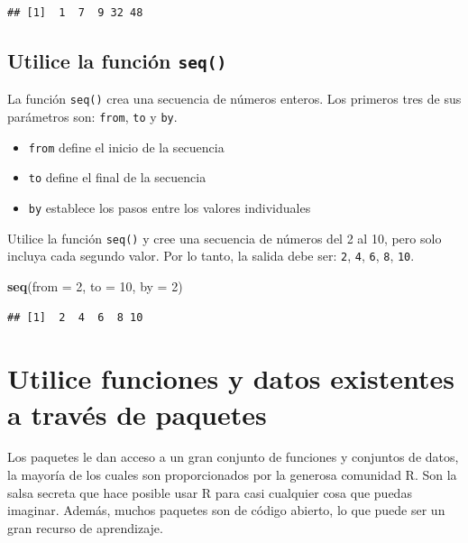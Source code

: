 \documentclass[
]{book}
\newenvironment{Shaded}{\begin{snugshade}}{\end{snugshade}}
\newcommand{\DataTypeTok}[1]{\textcolor[rgb]{0.13,0.29,0.53}{#1}}
\newcommand{\DecValTok}[1]{\textcolor[rgb]{0.00,0.00,0.81}{#1}}
\newcommand{\KeywordTok}[1]{\textcolor[rgb]{0.13,0.29,0.53}{\textbf{#1}}}
\newcommand{\NormalTok}[1]{#1}
\providecommand{\tightlist}{%
  \setlength{\itemsep}{0pt}\setlength{\parskip}{0pt}}
\begin{document}
\begin{verbatim}
## [1]  1  7  9 32 48
\end{verbatim}

\hypertarget{utilice-la-funciuxf3n-seq}{%
\subsection{\texorpdfstring{Utilice la función \texttt{seq()}}{Utilice la función seq()}}\label{utilice-la-funciuxf3n-seq}}

La función \texttt{seq()} crea una secuencia de números enteros. Los primeros tres de sus parámetros son: \texttt{from}, \texttt{to} y \texttt{by}.

\begin{itemize}
\tightlist
\item
  \texttt{from} define el inicio de la secuencia
\item
  \texttt{to} define el final de la secuencia
\item
  \texttt{by} establece los pasos entre los valores individuales
\end{itemize}

Utilice la función \texttt{seq()} y cree una secuencia de números del 2 al 10, pero solo incluya cada segundo valor. Por lo tanto, la salida debe ser: \texttt{2}, \texttt{4}, \texttt{6}, \texttt{8}, \texttt{10}.

\begin{Shaded}
\begin{Highlighting}[]
\KeywordTok{seq}\NormalTok{(}\DataTypeTok{from =} \DecValTok{2}\NormalTok{, }\DataTypeTok{to =} \DecValTok{10}\NormalTok{, }\DataTypeTok{by =} \DecValTok{2}\NormalTok{)}
\end{Highlighting}
\end{Shaded}

\begin{verbatim}
## [1]  2  4  6  8 10
\end{verbatim}

\hypertarget{utilice-funciones-y-datos-existentes-a-travuxe9s-de-paquetes}{%
\section{Utilice funciones y datos existentes a través de paquetes}\label{utilice-funciones-y-datos-existentes-a-travuxe9s-de-paquetes}}

Los paquetes le dan acceso a un gran conjunto de funciones y conjuntos de datos, la mayoría de los cuales son proporcionados por la generosa comunidad R. Son la salsa secreta que hace posible usar R para casi cualquier cosa que puedas imaginar. Además, muchos paquetes son de código abierto, lo que puede ser un gran recurso de aprendizaje.
\end{document}
